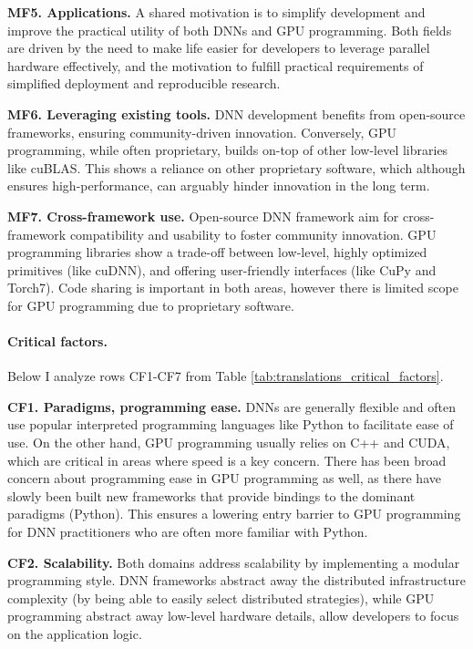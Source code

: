 \textbf{MF5. Applications.}
A shared motivation is to simplify development and improve the practical utility of both DNNs and GPU programming.
Both fields are driven by the need to make life easier for developers to leverage parallel hardware effectively,
and the motivation to fulfill practical requirements of simplified deployment and reproducible research.

\textbf{MF6. Leveraging existing tools.}
DNN development benefits from open-source frameworks, ensuring community-driven innovation. Conversely, GPU programming,
while often proprietary, builds on-top of other low-level libraries like cuBLAS. This shows a reliance on other
proprietary software, which although ensures high-performance, can arguably hinder innovation in the long term.

\textbf{MF7. Cross-framework use.}
Open-source DNN framework aim for cross-framework compatibility and usability to foster community innovation.
GPU programming libraries show a trade-off between low-level, highly optimized primitives (like cuDNN), and offering
user-friendly interfaces (like CuPy and Torch7). Code sharing is important in both areas, however there is limited
scope for GPU programming due to proprietary software.

\paragraph{Critical factors.}
Below I analyze rows CF1-CF7 from Table \ref{tab:translations_critical_factors}.

\textbf{CF1. Paradigms, programming ease.}
DNNs are generally flexible and often use popular interpreted programming languages like Python to facilitate
ease of use.
On the other hand, GPU programming usually relies on C++ and CUDA, which are critical in areas
where speed is a key concern. There has been broad concern about programming ease in GPU programming
as well, as there have slowly been built new frameworks that provide bindings to the dominant paradigms
(Python). This ensures a lowering entry barrier to GPU programming for DNN practitioners who are
often more familiar with Python.

\textbf{CF2. Scalability.}
Both domains address scalability by implementing a modular programming style. DNN frameworks abstract away
the distributed infrastructure complexity (by being able to easily select distributed strategies), while
GPU programming abstract away low-level hardware details, allow developers to focus on the application logic.

